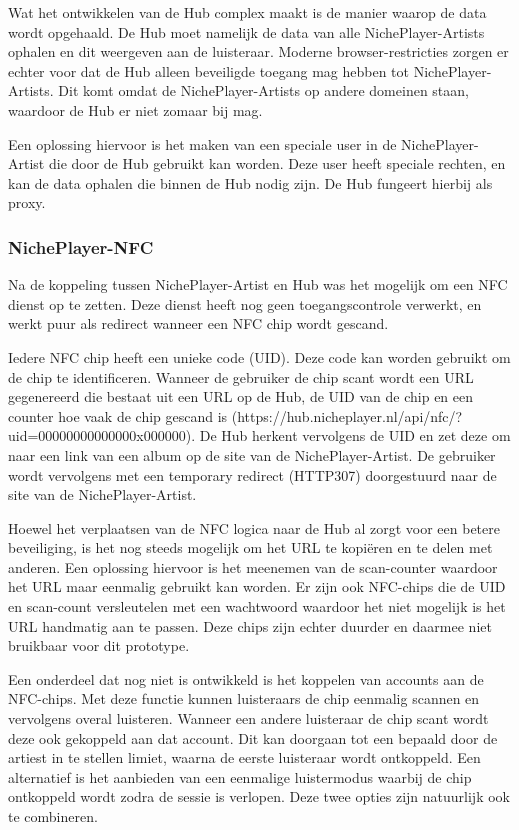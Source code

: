 Wat het ontwikkelen van de Hub complex maakt is de manier waarop de data wordt opgehaald. De Hub moet namelijk de data van alle NichePlayer-Artists ophalen en dit weergeven aan de luisteraar. Moderne browser-restricties zorgen er echter voor dat de Hub alleen beveiligde toegang mag hebben tot NichePlayer-Artists. Dit komt omdat de NichePlayer-Artists op andere domeinen staan, waardoor de Hub er niet zomaar bij mag.

Een oplossing hiervoor is het maken van een speciale user in de NichePlayer-Artist die door de Hub gebruikt kan worden. Deze user heeft speciale rechten, en kan de data ophalen die binnen de Hub nodig zijn. De Hub fungeert hierbij als proxy.

\subsubsection*{NichePlayer-NFC}
Na de koppeling tussen NichePlayer-Artist en Hub was het mogelijk om een NFC dienst op te zetten. Deze dienst heeft nog geen toegangscontrole verwerkt, en werkt puur als redirect wanneer een NFC chip wordt gescand.

Iedere NFC chip heeft een unieke code (UID). Deze code kan worden gebruikt om de chip te identificeren. Wanneer de gebruiker de chip scant wordt een URL gegenereerd die bestaat uit een URL op de Hub, de UID van de chip en een counter hoe vaak de chip gescand is (https://hub.nicheplayer.nl/api/nfc/?uid=00000000000000x000000). De Hub herkent vervolgens de UID en zet deze om naar een link van een album op de site van de NichePlayer-Artist. De gebruiker wordt vervolgens met een temporary redirect (HTTP307) doorgestuurd naar de site van de NichePlayer-Artist.

Hoewel het verplaatsen van de NFC logica naar de Hub al zorgt voor een betere beveiliging, is het nog steeds mogelijk om het URL te kopiëren en te delen met anderen. Een oplossing hiervoor is het meenemen van de scan-counter waardoor het URL maar eenmalig gebruikt kan worden. Er zijn ook NFC-chips die de UID en scan-count versleutelen met een wachtwoord waardoor het niet mogelijk is het URL handmatig aan te passen. Deze chips zijn echter duurder en daarmee niet bruikbaar voor dit prototype.

Een onderdeel dat nog niet is ontwikkeld is het koppelen van accounts aan de NFC-chips. Met deze functie kunnen luisteraars de chip eenmalig scannen en vervolgens overal luisteren. Wanneer een andere luisteraar de chip scant wordt deze ook gekoppeld aan dat account. Dit kan doorgaan tot een bepaald door de artiest in te stellen limiet, waarna de eerste luisteraar wordt ontkoppeld. Een alternatief is het aanbieden van een eenmalige luistermodus waarbij de chip ontkoppeld wordt zodra de sessie is verlopen. Deze twee opties zijn natuurlijk ook te combineren.

